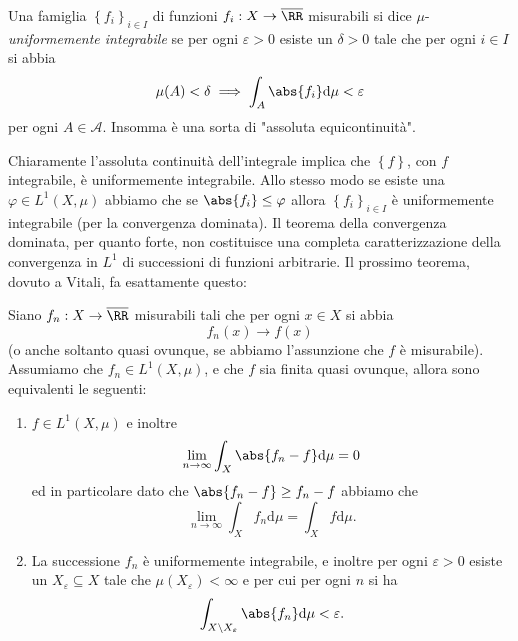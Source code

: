 \documentclass[11pt]{scrartcl}
\newcommand{\dif}{\text{d}}
\begin{document}
	\begin{definition}
		Una famiglia $\left\{f_i\right\}_{i\in I}$ di funzioni $f_i:X\to\overline{\RR}$ misurabili si dice $\mu$-\textit{uniformemente integrabile} se per ogni $\varepsilon>0$ esiste un $\delta>0$ tale che per ogni $i\in I$ si abbia
		$$\mu(A)<\delta \implies\int_A\abs{f_i}\dif \mu < \varepsilon$$
		per ogni $A\in \mathcal{A}$. Insomma è una sorta di "assoluta equicontinuità".
	\end{definition}
	Chiaramente l'assoluta continuità dell'integrale implica che $\left\{f\right\}$, con $f$ integrabile, è uniformemente integrabile. Allo stesso modo se esiste una $\varphi\in L^1(X,\mu)$ abbiamo che se $\abs{f_i}\le \varphi$ allora $\left\{f_i\right\}_{i\in I}$ è uniformemente integrabile (per la convergenza dominata). Il teorema della convergenza dominata, per quanto forte, non costituisce una completa caratterizzazione della convergenza in $L^1$ di successioni di funzioni arbitrarie. Il prossimo teorema, dovuto a Vitali, fa esattamente questo:
	\begin{theorem}[Vitali]
		Siano $f_n:X\to\overline{\RR}$ misurabili tali che per ogni $x\in X$ si abbia
		$$f_n(x)\to f(x)$$
		(o anche soltanto quasi ovunque, se abbiamo l'assunzione che $f$ è misurabile). Assumiamo che $f_n\in L^1(X,\mu)$, e che $f$ sia finita quasi ovunque, allora sono equivalenti le seguenti:
		\begin{enumerate}
			\item $f\in L^1(X,\mu)$ e inoltre
			$$\lim_{n\to\infty}\int_X \abs{f_n-f}\dif \mu =0$$
			ed in particolare dato che $\abs{f_n-f}\ge f_n-f$  abbiamo che
			$$\lim_{n\to\infty}\int_X f_n \dif \mu = \int_X f\dif \mu.$$
			\item La successione $f_n$ è uniformemente integrabile, e inoltre per ogni $\varepsilon>0$ esiste un $X_\varepsilon\subseteq X$ tale che 
			$\mu(X_\varepsilon)<\infty$ e per cui per ogni $n$ si ha
			$$\int_{X\setminus X_\varepsilon} \abs{f_n}\dif \mu < \varepsilon.$$
		\end{enumerate}
	\end{theorem}
\end{document}
